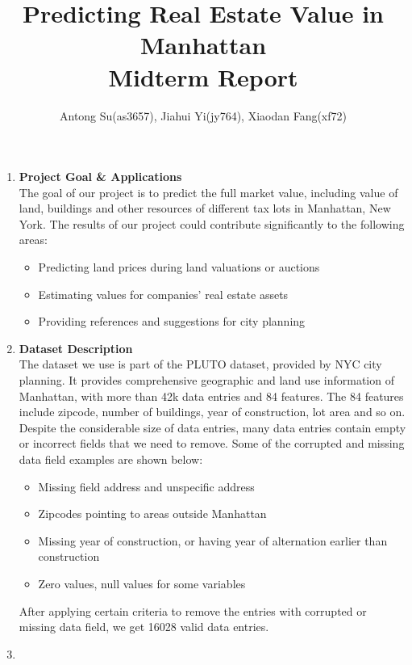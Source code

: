 \documentclass[11pt]{article}
\begin{document}
\author{Antong Su(as3657), Jiahui Yi(jy764), Xiaodan Fang(xf72)}
\title{Predicting Real Estate Value in Manhattan\\Midterm Report}
\maketitle

\begin{enumerate}
\item
\textbf{Project Goal \& Applications} \\
The goal of our project is to predict the full market value, including value of land, buildings and other resources of different tax lots in Manhattan, New York. The results of our project could contribute significantly to the following areas: 
\begin{itemize}\setlength\itemsep{-0.1em}
\item Predicting land prices during land valuations or auctions
\item Estimating values for companies' real estate assets
\item Providing references and suggestions for city planning
\end{itemize}

\item
\textbf{Dataset Description} \\
The dataset we use is part of the PLUTO dataset, provided by NYC city planning. It provides comprehensive geographic and land use information of Manhattan, with more than 42k data entries and 84 features. The 84 features include zipcode, number of buildings, year of construction, lot area and so on. Despite the considerable size of data entries, many data entries contain empty or incorrect fields that we need to remove. Some of the corrupted and missing data field examples are shown below:
\begin{itemize}\setlength\itemsep{-0.1em}
\item Missing field address and unspecific address
\item Zipcodes pointing to areas outside Manhattan
\item Missing year of construction, or having year of alternation earlier than construction
\item Zero values, null values for some variables
\end{itemize}
After applying certain criteria to remove the entries with corrupted or missing data field, we get 16028 valid data entries.
\item


\end{enumerate}
\end{document}
